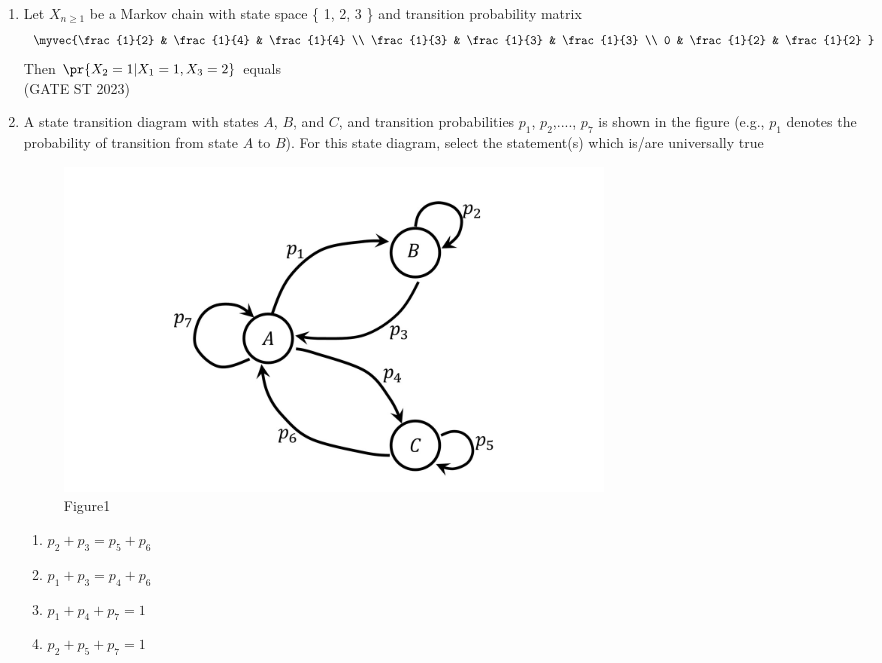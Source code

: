 \begin{enumerate}[label=\thechapter.\arabic*,ref=\thechapter.\theenumi]
\item Let $ X_{n \ge 1} $ be a Markov chain with state space \{ 1, 2, 3 \} and transition
probability matrix
$$ \myvec{\frac{1}{2} & \frac{1}{4} & \frac{1}{4} \\
\frac{1}{3} & \frac{1}{3} & \frac{1}{3} \\
0 & \frac{1}{2} & \frac{1}{2}
}$$
Then $\pr{X_2=1|X_1=1,X_3=2}$ equals\\
\hfill (GATE ST 2023)\\
\solution

\item A state transition diagram with states $A$, $B$, and $C$, and transition probabilities $p_1$, $p_2$,...., $p_7$ is shown in the figure (e.g., $p_1$ denotes the probability of transition from state $A$ to $B$). For this state diagram, select the statement(s) which is/are universally true
\begin{figure}[ht!]
	\centering
	\includegraphics[width=\columnwidth]{2022/EC/48/figs/fig.png}
    \caption{Figure1}
	\label{Fig:Figure12}
\end{figure}
\begin{enumerate}

\item $p_2 + p_3 = p_5 + p_6$\label{eq:28/2022/1}
\item $p_1 + p_3 = p_4 + p_6$
\item $p_1 + p_4 + p_7 = 1$\label{eq:28/2022/2}
\item $p_2 + p_5 +p_7 = 1$
\end{enumerate}

\end{enumerate}
